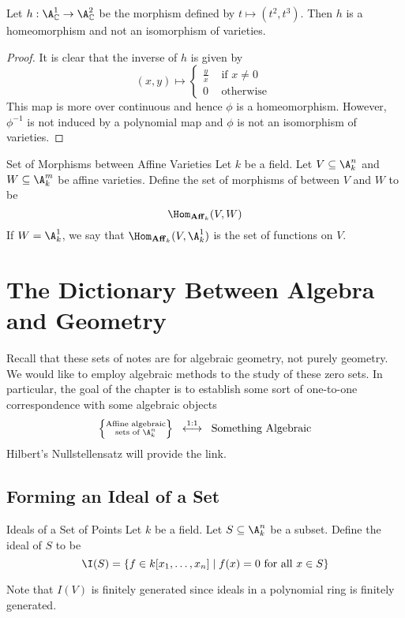 \documentclass[a4paper]{article}
\begin{document}
\begin{eg}{}{} Let $h:\A_\C^1\to\A_\C^2$ be the morphism defined by $t\mapsto(t^2,t^3)$. Then $h$ is a homeomorphism and not an isomorphism of varieties. 
\begin{proof}
It is clear that the inverse of $h$ is given by $$(x,y)\mapsto\begin{cases}
\frac{y}{x} & \text{ if }x\neq 0\\
0 & \text{ otherwise }
\end{cases}$$ This map is more over continuous and hence $\phi$ is a homeomorphism. However, $\phi^{-1}$ is not induced by a polynomial map and $\phi$ is not an isomorphism of varieties. 
\end{proof}
\end{eg}

\begin{defn}{Set of Morphisms between Affine Varieties}{} Let $k$ be a field. Let $V\subseteq\A_k^n$ and $W\subseteq\A_k^m$ be affine varieties. Define the set of morphisms of between $V$ and $W$ to be $$\Hom_{\bold{Aff}_k}(V,W)$$ If $W=\A_k^1$, we say that $\Hom_{\bold{Aff}_k}(V,\A_k^1)$ is the set of functions on $V$. 
\end{defn}

\pagebreak
\section{The Dictionary Between Algebra and Geometry}
Recall that these sets of notes are for algebraic geometry, not purely geometry. We would like to employ algebraic methods to the study of these zero sets. In particular, the goal of the chapter is to establish some sort of one-to-one correspondence with some algebraic objects $$\left\{\substack{\text{Affine algebraic}\\\text{sets of }\A_k^n}\right\}\;\;\overset{1:1}{\longleftrightarrow}\;\;\text{Something Algebraic}$$ Hilbert's Nullstellensatz will provide the link. 

\subsection{Forming an Ideal of a Set}
\begin{defn}{Ideals of a Set of Points}{} Let $k$ be a field. Let $S\subseteq\A_k^n$ be a subset. Define the ideal of $S$ to be $$\I(S)=\{f\in k[x_1,\dots,x_n]\;|\;f(x)=0\text{ for all }x\in S\}$$ 
\end{defn}

Note that $I(V)$ is finitely generated since ideals in a polynomial ring is finitely generated. 
\end{document}
